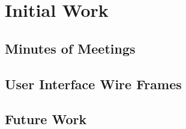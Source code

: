 \documentclass[11pt,a4paper]{article}
\begin{document}
\section{Initial Work}
\label{sec:initial-work}

\subsection{Minutes of Meetings}
\subsection{User Interface Wire Frames}
\subsection{Future Work}
\label{sec:future-work}

\newpage


\end{document}
